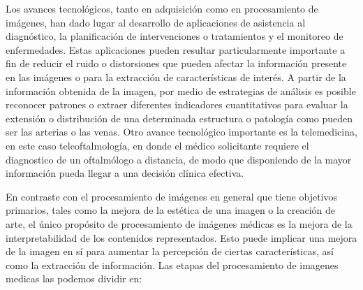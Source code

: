Los avances tecnológicos, tanto en adquisición como en procesamiento de imágenes, han dado lugar al desarrollo de aplicaciones de asistencia al diagnóstico, la planificación de intervenciones o tratamientos y el monitoreo de enfermedades. Estas aplicaciones pueden resultar particularmente importante a fin de reducir el ruido o distorsiones que pueden afectar la información presente en las imágenes o para la extracción de características de interés.
A partir de la información obtenida de la imagen, por medio de estrategias de análisis es posible reconocer patrones o extraer diferentes indicadores cuantitativos para evaluar la extensión o distribución de una determinada estructura o patología como pueden ser las arterias o las venas.
Otro avance tecnológico importante es la telemedicina, en este caso teleoftalmología, en donde el  médico solicitante requiere el diagnostico de un oftalmólogo a distancia, de modo que disponiendo de la mayor información pueda llegar a una decisión clínica efectiva.

En contraste con el procesamiento de imágenes en general que tiene objetivos primarios, tales como la mejora de la estética de una imagen o la creación de arte, el único propósito de procesamiento de imágenes médicas es la mejora de la interpretabilidad de los contenidos representados. Esto puede implicar una mejora de la imagen en sí para aumentar la percepción de ciertas características, así como la extracción de información.
Las etapas del procesamiento de imagenes medicas las podemos dividir en:


